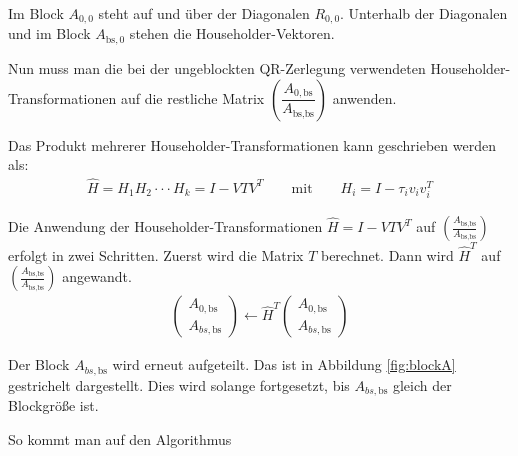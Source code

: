 Im Block $A_{0, 0}$ steht auf und über der Diagonalen $R_{0,0}$. Unterhalb der Diagonalen und im Block $A_{\text{bs}, 0}$ stehen die Householder-Vektoren.

Nun muss man die bei der ungeblockten QR-Zerlegung verwendeten Householder-Transformationen auf die restliche Matrix $ \left(\dfrac{A_{0, \text{bs}}}{A_{\text{bs}, \text{bs}}} \right)$ anwenden.

Das Produkt mehrerer Householder-Transformationen kann geschrieben werden als:
\begin{align*}
\hat{H} = H_1H_2 \cdot \cdot \cdot H_k = I - V T  V^T \qquad \text{mit}\qquad H_i = I - \tau_i v_iv_i^T
\end{align*}  \cite{Joffrain:2006:AHT:1141885.1141886}

Die Anwendung der Householder-Transformationen $\hat{H} = I - V T  V^T$ auf $\left(\frac{A_{\text{bs}, \text{bs}}}{A_{\text{bs}, \text{bs}}} \right)$ erfolgt in zwei Schritten. Zuerst wird  die Matrix $T$ berechnet. Dann wird $\hat{H}^T$  auf $\left(\frac{A_{\text{bs}, \text{bs}}}{A_{\text{bs}, \text{bs}}} \right)$ angewandt.
\begin{align}
	\left(\begin{array}{l} 
	A_{0, \text{bs}} \\ \hline
	A_{bs, \text{bs}}
	\end{array}\right)
	\leftarrow
	\hat{H}^T \left(\begin{array}{l} 
	A_{0, \text{bs}} \\ \hline
	A_{bs, \text{bs}}
	\end{array}\right)
\end{align}

Der Block $A_{bs, \text{bs}}$ wird erneut aufgeteilt. Das ist in Abbildung \ref{fig:blockA} gestrichelt dargestellt.
Dies wird solange fortgesetzt, bis $A_{bs, \text{bs}}$ gleich der Blockgröße ist.

So kommt man auf den Algorithmus 

